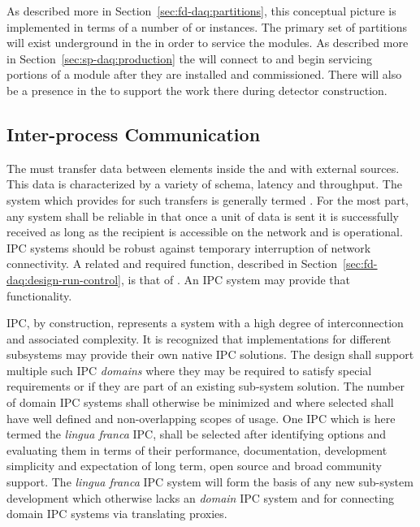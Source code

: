 
As described more in Section~\ref{sec:fd-daq:partitions}, this conceptual picture is implemented in terms of a number of  or instances. 
The primary set of partitions will exist underground in the  in order to service the  modules. 
As described more in Section~\ref{sec:sp-daq:production} the  will connect to and begin servicing portions of a  module after they are installed and commissioned. 
There will also be a  presence in the  to support the work there during detector construction.




  



\subsection{Inter-process Communication}
\label{sec:fd-daq:design-messages}

The  must transfer data between elements inside the  and with external sources. 
This data is characterized by a variety of schema, latency and throughput. 
The system which provides for such transfers is generally termed .
For the most part, any  system shall be reliable in that once a unit of data is sent it is successfully received as long as the recipient is accessible on the network and is operational. 
IPC systems should be robust against temporary interruption of network connectivity. 
A related and required function, described in Section~\ref{sec:fd-daq:design-run-control}, is that of . 
An IPC system may provide that functionality.

IPC, by construction, represents a system with a high degree of interconnection and associated complexity. 
It is recognized that implementations for different  subsystems may provide their own native IPC solutions. 
The  design shall support multiple such IPC \textit{domains} where they may be required to satisfy special requirements or if they are part of an existing sub-system solution. 
The number of domain IPC systems shall otherwise be minimized and where selected shall have well defined and non-overlapping scopes of usage. 
One IPC which is here termed the \textit{lingua franca} IPC, shall be selected after identifying options and evaluating them in terms of their performance, documentation, development simplicity and expectation of long term, open source and broad community support. 
The \textit{lingua franca} IPC system will form the basis of any new sub-system development which otherwise lacks an \textit{domain} IPC system and for connecting domain IPC systems via translating proxies.

